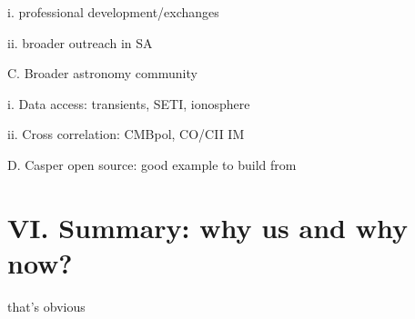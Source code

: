 \documentclass[preprint]{aastex}
\begin{document}
i. professional development/exchanges

ii. broader outreach in SA

C. Broader astronomy community

i. Data access: transients, SETI, ionosphere

ii. Cross correlation: CMBpol, CO/CII IM

D. Casper open source: good example to build from


\section{VI. Summary: why us and why now?} %

that's obvious


\clearpage
\setcounter{page}{1}
\thispagestyle{empty}
%
%


\end{document}
